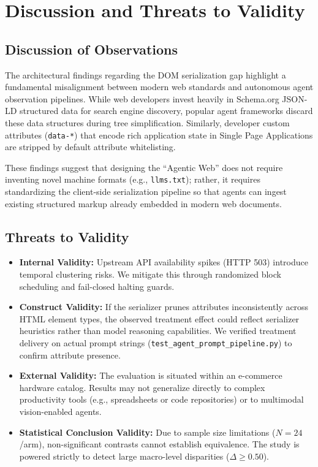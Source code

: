 \documentclass[11pt,a4paper]{article}
\begin{document}
\section{Discussion and Threats to Validity}
\label{sec:discussion}

\subsection{Discussion of Observations}
The architectural findings regarding the DOM serialization gap highlight a fundamental misalignment between modern web standards and autonomous agent observation pipelines. While web developers invest heavily in Schema.org JSON-LD structured data for search engine discovery, popular agent frameworks discard these data structures during tree simplification. Similarly, developer custom attributes (\texttt{data-*}) that encode rich application state in Single Page Applications are stripped by default attribute whitelisting.

These findings suggest that designing the ``Agentic Web'' does not require inventing novel machine formats (e.g., \texttt{llms.txt}); rather, it requires standardizing the client-side serialization pipeline so that agents can ingest existing structured markup already embedded in modern web documents.

\subsection{Threats to Validity}
\begin{itemize}
    \item \textbf{Internal Validity:} Upstream API availability spikes (HTTP 503) introduce temporal clustering risks. We mitigate this through randomized block scheduling and fail-closed halting guards.
    \item \textbf{Construct Validity:} If the serializer prunes attributes inconsistently across HTML element types, the observed treatment effect could reflect serializer heuristics rather than model reasoning capabilities. We verified treatment delivery on actual prompt strings (\texttt{test\_agent\_prompt\_pipeline.py}) to confirm attribute presence.
    \item \textbf{External Validity:} The evaluation is situated within an e-commerce hardware catalog. Results may not generalize directly to complex productivity tools (e.g., spreadsheets or code repositories) or to multimodal vision-enabled agents.
    \item \textbf{Statistical Conclusion Validity:} Due to sample size limitations ($N=24$/arm), non-significant contrasts cannot establish equivalence. The study is powered strictly to detect large macro-level disparities ($\Delta \ge 0.50$).
\end{itemize}
\end{document}
